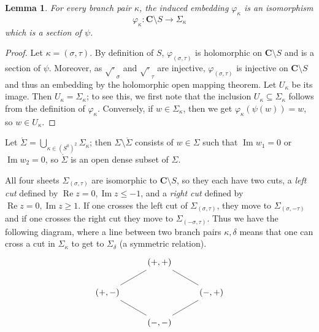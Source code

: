 \documentclass[reqno,12pt,letterpaper]{amsart}
\newcommand{\CC}{\mathbf{C}}
\renewcommand{\Re}{\operatorname{Re}}
\renewcommand{\Im}{\operatorname{Im}}
\newtheorem{lemma}[theorem]{Lemma}
\theoremstyle{definition}
\begin{document}
\begin{lemma}
For every branch pair $\kappa$, the induced embedding $\varphi_\kappa$ is an isomorphism
$$\varphi_\kappa: \CC \setminus S \to \Sigma_\kappa$$
which is a section of $\psi$.
\end{lemma}
\begin{proof}
Let $\kappa = (\sigma, \tau)$.
By definition of $S$, $\varphi_{(\sigma, \tau)}$ is holomorphic on $\CC \setminus S$ and is a section of $\psi$.
Moreover, as $\sqrt \cdot_\sigma$ and $\sqrt\cdot_\tau$ are injective, $\varphi_{(\sigma, \tau)}$ is injective on $\CC \setminus S$ and thus an embedding by the holomorphic open mapping theorem. Let $U_\kappa$ be its image.
Then $U_\kappa = \Sigma_\kappa$; to see this, we first note that the inclusion $U_\kappa \subseteq \Sigma_\kappa$ follows from the definition of $\varphi_\kappa$.
Conversely, if $w \in \Sigma_\kappa$, then we get $\varphi_\kappa(\psi(w)) = w$, so $w \in U_\kappa$.
\end{proof}

Let $\mathring \Sigma = \bigcup_{\kappa \in (S^0)^2} \Sigma_\kappa$; then $\Sigma \setminus \mathring \Sigma$ consists of $w \in \Sigma$ such that $\Im w_1 = 0$ or $\Im w_2 = 0$, so $\mathring \Sigma$ is an open dense subset of $\Sigma$.

All four sheets $\Sigma_{(\sigma,\tau)}$ are isomorphic to $\CC \setminus S$, so they each have two cuts, a \emph{left cut} defined by $\Re z = 0, \Im z \leq -1$, and a \emph{right cut} defined by $\Re z = 0, \Im z \geq 1$.
If one crosses the left cut of $\Sigma_{(\sigma, \tau)}$, they move to $\Sigma_{(\sigma, -\tau)}$ and if one crosses the right cut they move to $\Sigma_{(-\sigma, \tau)}$.
Thus we have the following diagram, where a line between two branch pairs $\kappa,\delta$ means that one can cross a cut in $\Sigma_\kappa$ to get to $\Sigma_\delta$ (a symmetric relation).
$$\begin{tikzcd}
&(+,+) \arrow[dash,dl] \arrow[dash,dr]\\
(+, -) \arrow[dash,dr] && (-,+) \arrow[dash,dl]\\
&(-,-)
\end{tikzcd}$$
\end{document}
